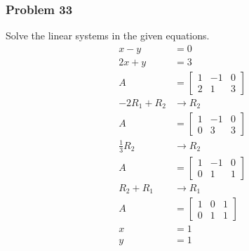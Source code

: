 \documentclass[letterpaper, 12pt]{math}
\begin{document}
\subsubsection*{Problem 33}
Solve the linear systems in the given equations.
\begin{align*}
  x-y &= 0 \\
  2x+y &= 3 \\
  A &= \left[\begin{array}{cc|c}
    1 & -1 & 0 \\
    2 & 1 & 3
  \end{array}\right] \\
  -2R_1+R_2 &\to R_2 \\
  A &= \left[\begin{array}{cc|c}
    1 & -1 & 0 \\
    0 & 3 & 3
  \end{array}\right] \\
  \frac{1}{3}R_2 &\to R_2 \\
  A &= \left[\begin{array}{cc|c}
    1 & -1 & 0 \\
    0 & 1 & 1
  \end{array}\right] \\
  R_2+R_1 &\to R_1 \\
  A &= \left[\begin{array}{cc|c}
    1 & 0 & 1 \\
    0 & 1 & 1
  \end{array}\right] \\
  x &= 1 \\
  y &= 1
\end{align*}
\end{document}
